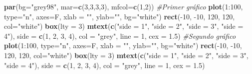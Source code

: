 \documentclass[]{article}
\newenvironment{Shaded}{\begin{snugshade}}{\end{snugshade}}
\newcommand{\KeywordTok}[1]{\textcolor[rgb]{0.13,0.29,0.53}{\textbf{{#1}}}}
\newcommand{\DataTypeTok}[1]{\textcolor[rgb]{0.13,0.29,0.53}{{#1}}}
\newcommand{\DecValTok}[1]{\textcolor[rgb]{0.00,0.00,0.81}{{#1}}}
\newcommand{\FloatTok}[1]{\textcolor[rgb]{0.00,0.00,0.81}{{#1}}}
\newcommand{\StringTok}[1]{\textcolor[rgb]{0.31,0.60,0.02}{{#1}}}
\newcommand{\CommentTok}[1]{\textcolor[rgb]{0.56,0.35,0.01}{\textit{{#1}}}}
\newcommand{\NormalTok}[1]{{#1}}
\begin{document}
\begin{Shaded}
\begin{Highlighting}[]
\KeywordTok{par}\NormalTok{(}\DataTypeTok{bg=}\StringTok{"grey98"}\NormalTok{, }\DataTypeTok{mar=}\KeywordTok{c}\NormalTok{(}\DecValTok{3}\NormalTok{,}\DecValTok{3}\NormalTok{,}\DecValTok{3}\NormalTok{,}\DecValTok{3}\NormalTok{), }\DataTypeTok{mfcol=}\KeywordTok{c}\NormalTok{(}\DecValTok{1}\NormalTok{,}\DecValTok{2}\NormalTok{))}
\CommentTok{#Primer gráfico}
\KeywordTok{plot}\NormalTok{(}\DecValTok{1}\NormalTok{:}\DecValTok{100}\NormalTok{, }\DataTypeTok{type=}\StringTok{"n"}\NormalTok{, }\DataTypeTok{axes=}\NormalTok{F, }\DataTypeTok{xlab =} \StringTok{""}\NormalTok{, }\DataTypeTok{ylab=}\StringTok{""}\NormalTok{, }\DataTypeTok{bg=}\StringTok{"white"}\NormalTok{)}
\KeywordTok{rect}\NormalTok{(-}\DecValTok{10}\NormalTok{, -}\DecValTok{10}\NormalTok{, }\DecValTok{120}\NormalTok{, }\DecValTok{120}\NormalTok{, }\DataTypeTok{col=}\StringTok{"white"}\NormalTok{)}
\KeywordTok{box}\NormalTok{(}\DataTypeTok{lty =} \DecValTok{3}\NormalTok{)}
\KeywordTok{mtext}\NormalTok{(}\KeywordTok{c}\NormalTok{(}\StringTok{"side = 1"}\NormalTok{, }\StringTok{"side = 2"}\NormalTok{, }\StringTok{"side = 3"}\NormalTok{, }\StringTok{"side = 4"}\NormalTok{),}
\DataTypeTok{side =} \KeywordTok{c}\NormalTok{(}\DecValTok{1}\NormalTok{, }\DecValTok{2}\NormalTok{, }\DecValTok{3}\NormalTok{, }\DecValTok{4}\NormalTok{), }\DataTypeTok{col =} \StringTok{"grey"}\NormalTok{, }\DataTypeTok{line =} \DecValTok{1}\NormalTok{, }\DataTypeTok{cex =} \FloatTok{1.5}\NormalTok{)}
\CommentTok{#Segundo gráfico}
\KeywordTok{plot}\NormalTok{(}\DecValTok{1}\NormalTok{:}\DecValTok{100}\NormalTok{, }\DataTypeTok{type=}\StringTok{"n"}\NormalTok{, }\DataTypeTok{axes=}\NormalTok{F, }\DataTypeTok{xlab =} \StringTok{""}\NormalTok{, }\DataTypeTok{ylab=}\StringTok{""}\NormalTok{, }\DataTypeTok{bg=}\StringTok{"white"}\NormalTok{)}
\KeywordTok{rect}\NormalTok{(-}\DecValTok{10}\NormalTok{, -}\DecValTok{10}\NormalTok{, }\DecValTok{120}\NormalTok{, }\DecValTok{120}\NormalTok{, }\DataTypeTok{col=}\StringTok{"white"}\NormalTok{)}
\KeywordTok{box}\NormalTok{(}\DataTypeTok{lty =} \DecValTok{3}\NormalTok{)}
\KeywordTok{mtext}\NormalTok{(}\KeywordTok{c}\NormalTok{(}\StringTok{"side = 1"}\NormalTok{, }\StringTok{"side = 2"}\NormalTok{, }\StringTok{"side = 3"}\NormalTok{, }\StringTok{"side = 4"}\NormalTok{),}
\DataTypeTok{side =} \KeywordTok{c}\NormalTok{(}\DecValTok{1}\NormalTok{, }\DecValTok{2}\NormalTok{, }\DecValTok{3}\NormalTok{, }\DecValTok{4}\NormalTok{), }\DataTypeTok{col =} \StringTok{"grey"}\NormalTok{, }\DataTypeTok{line =} \DecValTok{1}\NormalTok{, }\DataTypeTok{cex =} \FloatTok{1.5}\NormalTok{)}
\end{Highlighting}
\end{Shaded}
\end{document}
